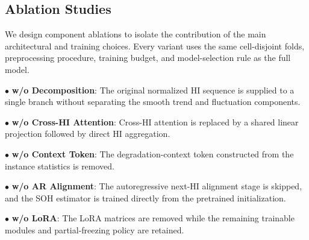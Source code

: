 \documentclass[preprint,12pt]{elsarticle}
\begin{document}
\subsection{Ablation Studies}

We design component ablations to isolate the contribution of the main architectural and training choices. Every variant uses the same cell-disjoint folds, preprocessing procedure, training budget, and model-selection rule as the full model.

$\bullet$ \textbf{w/o Decomposition}: The original normalized HI sequence is supplied to a single branch without separating the smooth trend and fluctuation components.

$\bullet$ \textbf{w/o Cross-HI Attention}: Cross-HI attention is replaced by a shared linear projection followed by direct HI aggregation.

$\bullet$ \textbf{w/o Context Token}: The degradation-context token constructed from the instance statistics is removed.

$\bullet$ \textbf{w/o AR Alignment}: The autoregressive next-HI alignment stage is skipped, and the SOH estimator is trained directly from the pretrained initialization.

$\bullet$ \textbf{w/o LoRA}: The LoRA matrices are removed while the remaining trainable modules and partial-freezing policy are retained.
\end{document}
